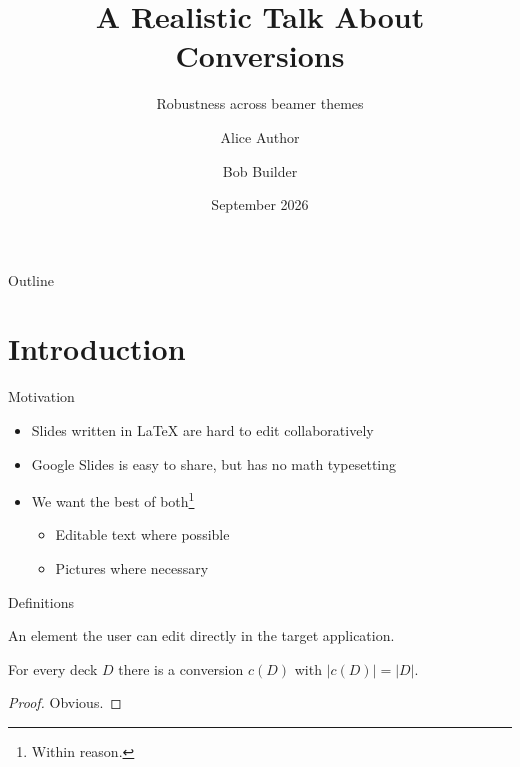 \usepackage{amsmath,amssymb,booktabs}
\graphicspath{{../../../decks/img/}}
\title[Short Title]{A Realistic Talk About Conversions}
\subtitle{Robustness across beamer themes}
\author[A.~Author]{Alice Author \and Bob Builder}
\date{September 2026}



\begin{frame}
  \titlepage
\end{frame}

\begin{frame}{Outline}
  \tableofcontents
\end{frame}

\section{Introduction}

\begin{frame}{Motivation}
  \begin{itemize}
    \item Slides written in \LaTeX{} are hard to edit collaboratively
    \item Google Slides is \alert{easy to share}, but has no math typesetting
    \item We want the best of both\footnote{Within reason.}
      \begin{itemize}
        \item Editable text where possible
        \item Pictures where necessary
      \end{itemize}
  \end{itemize}
\end{frame}

\begin{frame}{Definitions}
  \begin{definition}
    An element the user can edit directly in the target application.
  \end{definition}
  \begin{theorem}
    For every deck $D$ there is a conversion $c(D)$ with $|c(D)| = |D|$.
  \end{theorem}
  \begin{proof}
    Obvious.
  \end{proof}
\end{frame}

